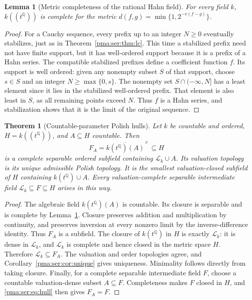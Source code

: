 \documentclass[11pt]{article}
\numberwithin{equation}{section}
\newtheorem{theorem}{Theorem}[section]
\newtheorem{lemma}[lemma]{Lemma}
\theoremstyle{definition}
\theoremstyle{remark}
\newcommand{\Q}{\mathbb Q}
\newcommand{\Lk}{\mathcal L_k}
\begin{document}
\begin{lemma}[Metric completeness of the rational Hahn field]
\label{pma:ser:lem:hahncomplete}
For every field $k$, $k((t^\Q))$ is complete for the metric
$d(f,g)=\min\{1,2^{-v(f-g)}\}$.
\end{lemma}
\begin{proof}
For a Cauchy sequence, every prefix up to an integer $N\geq0$ eventually
stabilizes, just as in Theorem~\ref{pma:ser:thm:lc}. This time a stabilized prefix
need not have finite support, but it has well-ordered support because it is
a prefix of a Hahn series. The compatible stabilized prefixes define a
coefficient function $f$.
Its support is well ordered: given any nonempty subset $S$ of that support,
choose $s\in S$ and an integer $N\geq\max\{0,s\}$. The nonempty set
$S\cap(-\infty,N]$ has a least element since it lies in the stabilized
well-ordered prefix. That element is also least in $S$, as all remaining
points exceed $N$. Thus $f$ is a Hahn series, and stabilization shows that
it is the limit of the original sequence.
\end{proof}

\begin{theorem}[Countable-parameter Polish hulls]\label{pma:ser:thm:hulls}
Let $k$ be countable and ordered, $H=k((t^\Q))$, and $A\subseteq H$ countable.
Then
\begin{equation}\label{pma:ser:eq:hull}
 F_A=\overline{k(t^\Q)(A)}^{\,v}\ \subseteq H
\end{equation}
is a complete separable ordered subfield containing $\Lk\cup A$.
Its valuation topology is its unique admissible Polish topology.
It is the smallest valuation-closed subfield of $H$ containing
$k(t^\Q)\cup A$.
Every valuation-complete separable intermediate field
$\Lk\subseteq F\subseteq H$ arises in this way.
\end{theorem}
\begin{proof}
The algebraic field $k(t^\Q)(A)$ is countable. Its closure is separable and
is complete by Lemma~\ref{pma:ser:lem:hahncomplete}. Closure preserves addition and
multiplication by continuity, and preserves inversion at every nonzero limit
by the inverse-difference identity. Thus $F_A$ is a subfield.
The closure of $k(t^\Q)$ in $H$ is exactly $\Lk$: it is dense in $\Lk$,
and $\Lk$ is complete and hence closed in the metric space $H$.
Therefore $\Lk\subseteq F_A$.
The valuation and order topologies agree, and
Corollary~\ref{pma:ser:cor:unique} gives uniqueness. Minimality follows directly
from taking closure. Finally, for a complete separable intermediate field
$F$, choose a countable valuation-dense subset $A\subseteq F$.
Completeness makes $F$ closed in $H$, and \eqref{pma:ser:eq:hull} then gives
$F_A=F$.
\end{proof}
\end{document}
